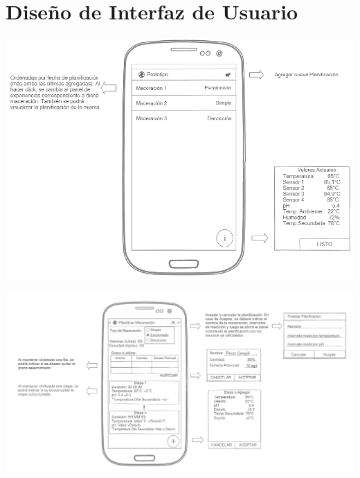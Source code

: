     \begin{minipage}{0.95\textwidth}
    \chapter{Diseño de Interfaz de Usuario}
        \centering
        \includegraphics[scale=0.55]{Anexo/MockUp/MainActivity.jpg}
        \label{fig:MockUpMainActivity}
    \end{minipage}
    
    \begin{minipage}{0.95\textwidth}

        \centering
        \includegraphics[scale=0.55, angle =90]{Anexo/MockUp/PlanningActivity.jpg}
        \label{fig:MockUpPlanningActivity}
    \end{minipage}
    
